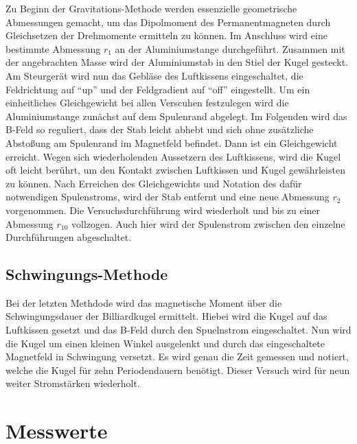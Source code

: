 \noindent Zu Beginn der Gravitations-Methode werden essenzielle geometrische Abmessungen gemacht, um das Dipolmoment des 
Permanentmagneten durch Gleichsetzen der Drehmomente ermitteln zu können. Im Anschluss wird eine bestimmte Abmessung $r_1$ 
an der Aluminiumstange durchgeführt. Zusammen mit der angebrachten Masse wird der Aluminiumstab in den Stiel der Kugel gesteckt. 
Am Steurgerät wird nun das Gebläse des Luftkissens eingeschaltet, die Feldrichtung auf \enquote{up} und der Feldgradient auf 
\enquote{off} eingestellt. Um ein einheitliches Gleichgewicht bei allen Verscuhen festzulegen wird die Aluminiumstange zunächst auf 
dem Spulenrand abgelegt. Im Folgenden wird das B-Feld so reguliert, dass der Stab leicht abhebt und sich ohne zusätzliche 
Abstoßung am Spulenrand im Magnetfeld befindet. Dann ist ein Gleichgewicht erreicht. Wegen sich wiederholenden Aussetzern des 
Luftkissens, wird die Kugel oft leicht berührt, um den Kontakt zwischen Luftkissen und Kugel gewährleisten zu können.
Nach Erreichen des Gleichgewichts und Notation des dafür notwendigen Spulenstroms, wird der Stab entfernt und eine neue Abmessung 
$r_2$ vorgenommen. Die Versuchsdurchführung wird wiederholt und bis zu einer Abmessung $r_10$ vollzogen. Auch hier wird der 
Spulenstrom zwischen den einzelne Durchführungen abgeschaltet.

\subsection{Schwingungs-Methode}

\noindent Bei der letzten Methdode wird das magnetische Moment über die Schwingungsdauer der Billiardkugel ermittelt. Hiebei wird
die Kugel auf das Luftkissen gesetzt und das B-Feld durch den Spuelnstrom eingeschaltet. Nun wird die Kugel um einen kleinen Winkel 
ausgelenkt und durch das eingeschaltete Magnetfeld in Schwingung versetzt. Es wird genau die Zeit gemessen und notiert, welche 
die Kugel für zehn Periodendauern benötigt. Dieser Versuch wird für neun weiter Stromstärken wiederholt.

\section{Messwerte}



